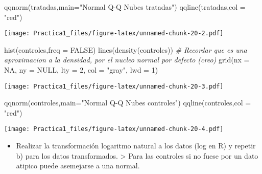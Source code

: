 \documentclass[
]{article}
\newenvironment{Shaded}{\begin{snugshade}}{\end{snugshade}}
\newcommand{\AttributeTok}[1]{\textcolor[rgb]{0.77,0.63,0.00}{#1}}
\newcommand{\CommentTok}[1]{\textcolor[rgb]{0.56,0.35,0.01}{\textit{#1}}}
\newcommand{\ConstantTok}[1]{\textcolor[rgb]{0.00,0.00,0.00}{#1}}
\newcommand{\DecValTok}[1]{\textcolor[rgb]{0.00,0.00,0.81}{#1}}
\newcommand{\FunctionTok}[1]{\textcolor[rgb]{0.00,0.00,0.00}{#1}}
\newcommand{\NormalTok}[1]{#1}
\newcommand{\StringTok}[1]{\textcolor[rgb]{0.31,0.60,0.02}{#1}}
\providecommand{\tightlist}{%
  \setlength{\itemsep}{0pt}\setlength{\parskip}{0pt}}
\begin{document}
\begin{Shaded}
\begin{Highlighting}[]
\FunctionTok{qqnorm}\NormalTok{(tratadas,}\AttributeTok{main=}\StringTok{"Normal Q{-}Q Nubes tratadas"}\NormalTok{)}
\FunctionTok{qqline}\NormalTok{(tratadas,}\AttributeTok{col =} \StringTok{"red"}\NormalTok{)}
\end{Highlighting}
\end{Shaded}

\texttt{[image: Practica1\_files/figure-latex/unnamed-chunk-20-2.pdf]}

\begin{Shaded}
\begin{Highlighting}[]
\FunctionTok{hist}\NormalTok{(controles,}\AttributeTok{freq =} \ConstantTok{FALSE}\NormalTok{)}
\FunctionTok{lines}\NormalTok{(}\FunctionTok{density}\NormalTok{(controles)) }\CommentTok{\# Recordar que es una aproximacion a la densidad, por el nucleo normal por defecto (creo)}
\FunctionTok{grid}\NormalTok{(}\AttributeTok{nx =} \ConstantTok{NA}\NormalTok{, }\AttributeTok{ny =} \ConstantTok{NULL}\NormalTok{, }\AttributeTok{lty =} \DecValTok{2}\NormalTok{, }\AttributeTok{col =} \StringTok{"gray"}\NormalTok{, }\AttributeTok{lwd =} \DecValTok{1}\NormalTok{)}
\end{Highlighting}
\end{Shaded}

\texttt{[image: Practica1\_files/figure-latex/unnamed-chunk-20-3.pdf]}

\begin{Shaded}
\begin{Highlighting}[]
\FunctionTok{qqnorm}\NormalTok{(controles,}\AttributeTok{main=}\StringTok{"Normal Q{-}Q Nubes controles"}\NormalTok{)}
\FunctionTok{qqline}\NormalTok{(controles,}\AttributeTok{col =} \StringTok{"red"}\NormalTok{)}
\end{Highlighting}
\end{Shaded}

\texttt{[image: Practica1\_files/figure-latex/unnamed-chunk-20-4.pdf]}

\begin{itemize}
\tightlist
\item
  Realizar la transformación logaritmo natural a los datos (log en R) y
  repetir b) para los datos transformados. \textgreater{} Para las
  controles si no fuese por un dato atipico puede asemejarse a una
  normal.
\end{itemize}
\end{document}
